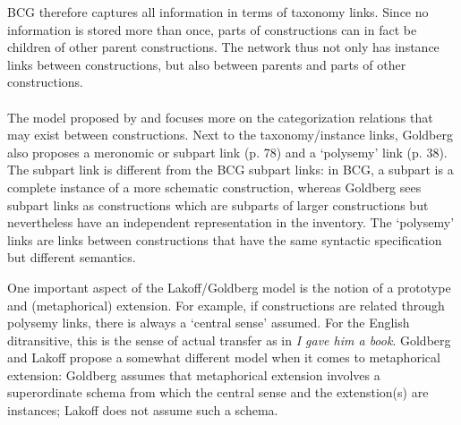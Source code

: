 BCG therefore captures all information in terms of taxonomy links. Since no information is stored more than once, parts of constructions can in fact be children of other parent constructions. The network thus not only has instance links between constructions, but also between parents and parts of other constructions.
\\
\\
 The model proposed by \citet{lakoff87woman} and \citet{goldberg95construction} focuses more on the categorization relations that may exist between constructions. Next to the taxonomy/instance links, Goldberg also proposes a meronomic or subpart link (p. 78) and a `polysemy' link (p. 38). The subpart link is different from the BCG subpart links: in BCG, a subpart is a complete instance of a more schematic construction, whereas Goldberg sees subpart links as constructions which are subparts of larger constructions but nevertheless have an independent representation in the inventory. The `polysemy' links are links between constructions that have the same syntactic specification but different semantics.

One important aspect of the Lakoff/Goldberg model is the notion of a prototype and (metaphorical) extension. For example, if constructions are related through polysemy links, there is always a `central sense' assumed. For the English ditransitive, this is the sense of actual transfer as in {\em I gave him a book}. Goldberg and Lakoff propose a somewhat different model when it comes to metaphorical extension: Goldberg assumes that metaphorical extension involves a superordinate schema from which the central sense and the extenstion(s) are instances; Lakoff does not assume such a schema.

